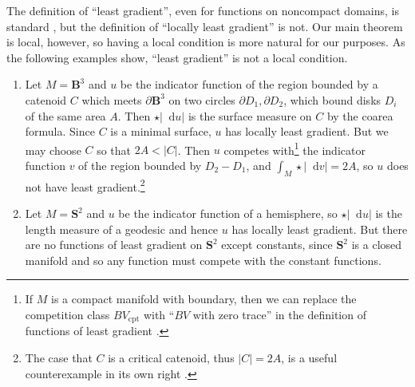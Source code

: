 \documentclass[reqno,11pt]{amsart}
\newcommand{\Sph}{\mathbf S}
\newcommand{\Ball}{\mathbf{B}}
\newcommand*\dif{\mathop{}\!\mathrm{d}}
\newcommand{\cpt}{\mathrm{cpt}}
\theoremstyle{definition}
\numberwithin{equation}{section}
\begin{document}
The definition of ``least gradient'', even for functions on noncompact domains, is standard \cite{Miranda67}, but the definition of ``locally least gradient'' is not.
Our main theorem is local, however, so having a local condition is more natural for our purposes.
As the following examples show, ``least gradient'' is not a local condition.
\begin{enumerate}
\item Let $M = \Ball^3$ and $u$ be the indicator function of the region bounded by a catenoid $C$ which meets $\partial \Ball^3$ on two circles $\partial D_1, \partial D_2$, which bound disks $D_i$ of the same area $A$.
Then $\star |\dif u|$ is the surface measure on $C$ by the coarea formula.
Since $C$ is a minimal surface, $u$ has locally least gradient.
But we may choose $C$ so that $2A < |C|$.
Then $u$ competes with\footnote{If $M$ is a compact manifold with boundary, then we can replace the competition class $BV_\cpt$ with ``$BV$ with zero trace'' in the definition of functions of least gradient \cite[\S9]{Korte19}.} the indicator function $v$ of the region bounded by $D_2 - D_1$, and $\int_M \star |\dif v| = 2A$, so $u$ does not have least gradient.\footnote{The case that $C$ is a critical catenoid, thus $|C| = 2A$, is a useful counterexample in its own right \cite[Example 4.3]{górny2018}.}
\item Let $M = \Sph^2$ and $u$ be the indicator function of a hemisphere, so $\star |\dif u|$ is the length measure of a geodesic and hence $u$ has locally least gradient.
But there are no functions of least gradient on $\Sph^2$ except constants, since $\Sph^2$ is a closed manifold and so any function must compete with the constant functions.
\end{enumerate}
\end{document}
